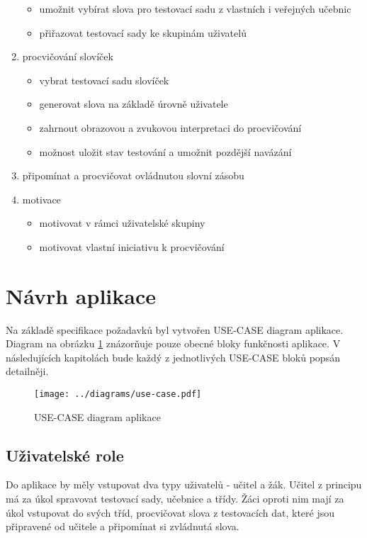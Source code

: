 \documentclass[a4paper,11pt,titlepage,fleqn]{article}
\begin{document}
\begin{enumerate}
\begin{itemize}
                    \item umožnit vybírat slova pro testovací sadu z vlastních i veřejných učebnic
                    \item přiřazovat testovací sady ke skupinám uživatelů
                \end{itemize}
            \item procvičování slovíček
                \begin{itemize}
                    \item vybrat testovací sadu slovíček
                    \item generovat slova na základě úrovně uživatele
                    \item zahrnout obrazovou a zvukovou interpretaci do procvičování
                    \item možnost uložit stav testování a umožnit pozdější navázání
                \end{itemize}
            \item připomínat a procvičovat ovládnutou slovní zásobu 
            \item motivace
                \begin{itemize}
                    \item motivovat v rámci uživatelské skupiny
                    \item motivovat vlastní iniciativu k procvičování
                \end{itemize}
        \end{enumerate}


\newpage
\section{Návrh aplikace}
    Na základě specifikace požadavků byl vytvořen USE-CASE diagram aplikace. Diagram na obrázku \ref{fig:use-case} znázorňuje pouze obecné bloky funkčnosti aplikace. V následujících kapitolách bude každý z jednotlivých USE-CASE bloků popsán detailněji.

        \begin{figure}[ht!]
            \centering
            \texttt{[image: ../diagrams/use-case.pdf]}
            \caption{USE-CASE diagram aplikace}
            \label{fig:use-case}
        \end{figure}

    \subsection{Uživatelské role}
        Do aplikace by měly vstupovat dva typy uživatelů - učitel a žák. Učitel z principu má za úkol spravovat testovací sady, učebnice a třídy. Žáci oproti nim mají za úkol vstupovat do svých tříd, procvičovat slova z testovacích dat, které jsou připravené od učitele a připomínat si zvládnutá slova. 
\end{document}
